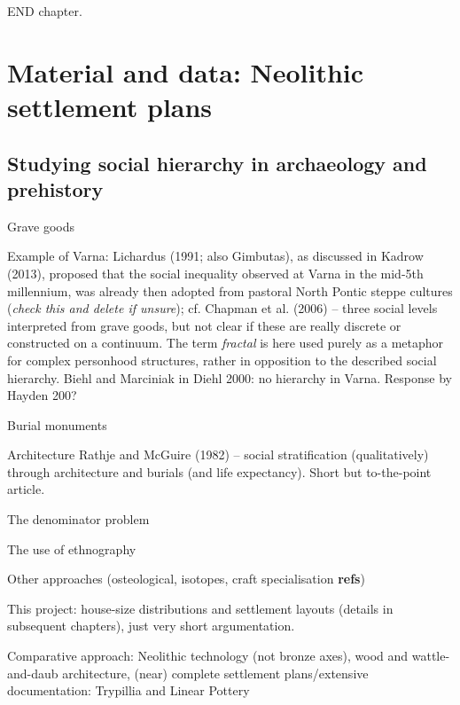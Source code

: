 \documentclass[
  12pt,
  a4paper, twoside]{book}
\begin{document}
END chapter.

\hypertarget{material}{%
\chapter{Material and data: Neolithic settlement plans}\label{material}}

\hypertarget{complexity-archaeo}{%
\section{Studying social hierarchy in archaeology and prehistory}\label{complexity-archaeo}}

Grave goods

Example of Varna: Lichardus (1991; also Gimbutas), as discussed in Kadrow (2013), proposed that the social inequality observed at Varna in the mid-5th millennium, was already then adopted from pastoral North Pontic steppe cultures (\emph{check this and delete if unsure}); cf. Chapman et al. (2006) -- three social levels interpreted from grave goods, but not clear if these are really discrete or constructed on a continuum. The term \emph{fractal} is here used purely as a metaphor for complex personhood structures, rather in opposition to the described social hierarchy. Biehl and Marciniak in Diehl 2000: no hierarchy in Varna. Response by Hayden 200?

Burial monuments

Architecture Rathje and McGuire (1982) -- social stratification (qualitatively) through architecture and burials (and life expectancy). Short but to-the-point article.

The denominator problem

The use of ethnography

Other approaches (osteological, isotopes, craft specialisation \textbf{refs})

This project: house-size distributions and settlement layouts (details in subsequent chapters), just very short argumentation.

Comparative approach: Neolithic technology (not bronze axes), wood and wattle-and-daub architecture, (near) complete settlement plans/extensive documentation: Trypillia and Linear Pottery
\end{document}
